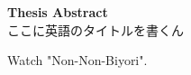 \documentclass[Main]{subfiles}
\begin{document}
\thispagestyle{empty}
\begin{center}
    {\Huge \textbf{Thesis Abstract}}\\
    {\Large ここに英語のタイトルを書くん}
\end{center}

Watch "Non-Non-Biyori".

\newpage
\end{document}
